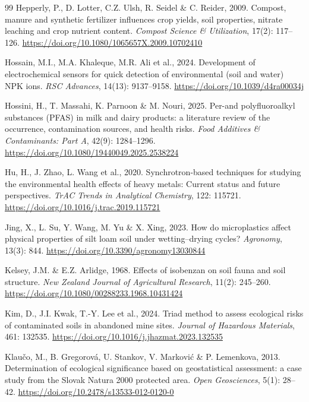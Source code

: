 \documentclass[sn-mathphys-num]{sn-jnl}
\begin{document}
\begin{thebibliography}{99}
Hepperly, P., D. Lotter, C.Z. Ulsh, R. Seidel \& C. Reider, 2009.
Compost, manure and synthetic fertilizer influences crop yields, soil
properties, nitrate leaching and crop nutrient content.
\textit{Compost Science \& Utilization}, 17(2): 117--126.
\url{https://doi.org/10.1080/1065657X.2009.10702410}

Hossain, M.I., M.A. Khaleque, M.R. Ali et al., 2024.
Development of electrochemical sensors for quick detection of environmental
(soil and water) NPK ions.
\textit{RSC Advances}, 14(13): 9137--9158.
\url{https://doi.org/10.1039/d4ra00034j}

Hossini, H., T. Massahi, K. Parnoon \& M. Nouri, 2025.
Per-and polyfluoroalkyl substances (PFAS) in milk and dairy products: a
literature review of the occurrence, contamination sources, and health risks.
\textit{Food Additives \& Contaminants: Part A}, 42(9): 1284--1296.
\url{https://doi.org/10.1080/19440049.2025.2538224}

Hu, H., J. Zhao, L. Wang et al., 2020.
Synchrotron-based techniques for studying the environmental health effects of
heavy metals: Current status and future perspectives.
\textit{TrAC Trends in Analytical Chemistry}, 122: 115721.
\url{https://doi.org/10.1016/j.trac.2019.115721}

Jing, X., L. Su, Y. Wang, M. Yu \& X. Xing, 2023.
How do microplastics affect physical properties of silt loam soil under
wetting--drying cycles?
\textit{Agronomy}, 13(3): 844.
\url{https://doi.org/10.3390/agronomy13030844}

Kelsey, J.M. \& E.Z. Arlidge, 1968.
Effects of isobenzan on soil fauna and soil structure.
\textit{New Zealand Journal of Agricultural Research}, 11(2): 245--260.
\url{https://doi.org/10.1080/00288233.1968.10431424}

Kim, D., J.I. Kwak, T.-Y. Lee et al., 2024.
Triad method to assess ecological risks of contaminated soils in abandoned
mine sites.
\textit{Journal of Hazardous Materials}, 461: 132535.
\url{https://doi.org/10.1016/j.jhazmat.2023.132535}

Klau\v{c}o, M., B. Gregorov\'{a}, U. Stankov, V. Markovi\'{c} \&
P. Lemenkova, 2013.
Determination of ecological significance based on geostatistical assessment:
a case study from the Slovak Natura 2000 protected area.
\textit{Open Geosciences}, 5(1): 28--42.
\url{https://doi.org/10.2478/s13533-012-0120-0}


\end{thebibliography}
\end{document}
